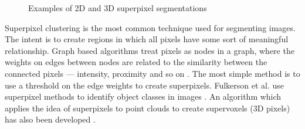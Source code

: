 \documentclass[11pt,a4paper]{kth-mag}
\begin{document}
\begin{figure}
  \centerline{
  }
  \caption{Examples of 2D and 3D superpixel segmentations}
  \label{fig:meanshift}
\end{figure}

Superpixel clustering is the most common technique used for segmenting images.
The intent is to create regions in which all pixels have some sort of meaningful
relationship. Graph based algorithms treat pixels as nodes in a graph, where the
weights on edges between nodes are related to the similarity between the
connected pixels --- intensity, proximity and so on \cite{achanta2012slic}. The
most simple method is to use a threshold on the edge weights to create
superpixels. Fulkerson et al. use superpixel methods to identify object classes
in images \cite{fulkerson2009class}. An algorithm which applies the idea of
superpixels to point clouds to create supervoxels (3D pixels) has also been
developed \cite{papon2013voxel}.
\end{document}
